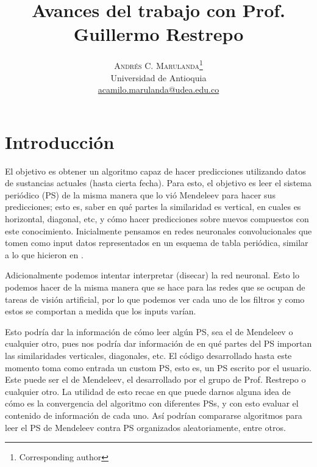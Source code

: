 \documentclass[twoside,twocolumn]{article}
\begin{document}
\title{Avances del trabajo con Prof. Guillermo Restrepo} 

\author{%
\textsc{Andr\'es C. Marulanda}\thanks{Corresponding author} \\[1ex]
\normalsize Universidad de Antioquia \\ %
\normalsize \href{mailto:correoAndres}{acamilo.marulanda@udea.edu.co} %
}


\maketitle


\section{Introducci\'on}
\label{sec:intro}

El objetivo es obtener un algoritmo capaz de hacer predicciones utilizando datos de sustancias actuales (hasta cierta fecha). Para esto, el objetivo es leer el sistema peri\'odico (PS) de la misma manera que lo vi\'o Mendeleev para hacer sus predicciones; esto es, saber en qu\'e partes la similaridad es vertical, en cuales es horizontal, diagonal, etc, y c\'omo hacer predicciones sobre nuevos compuestos con este conocimiento.
Inicialmente pensamos en redes neuronales convolucionales que tomen como input datos representados en un esquema de tabla peri\'odica, similar a lo que hicieron en \cite{CNN_dH}.

Adicionalmente podemos intentar interpretar (disecar) la red neuronal. Esto lo podemos hacer de la misma manera que se hace para las redes que se ocupan de tareas de visi\'on artificial, por lo que podemos ver cada uno de los filtros y como estos se comportan a medida que los inputs var\'ian. 

Esto podr\'ia dar la informaci\'on de c\'omo leer alg\'un PS, sea el de Mendeleev o cualquier otro, pues nos podr\'ia dar informaci\'on de en qu\'e partes del PS importan las similaridades verticales, diagonales, etc. 
El c\'odigo desarrollado hasta este momento toma como entrada un custom PS, esto es, un PS escrito por el usuario. Este puede ser el de Mendeleev, el desarrollado por el grupo de Prof. Restrepo o cualquier otro. La utilidad de esto recae en que puede darnos alguna idea de c\'omo es la convergencia del algoritmo con diferentes PSs, y con esto evaluar el contenido de informaci\'on de cada uno. As\'i podr\'ian compararse algoritmos para leer el PS de Mendeleev contra PS organizados aleatoriamente, entre otros.
\end{document}
